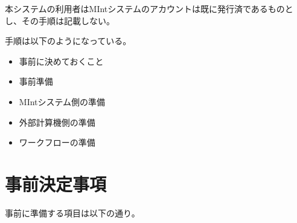 \documentclass[letterpaper,10pt,dvipdfmx,openany]{sphinxmanual}
\begin{document}
本システムの利用者はMIntシステムのアカウントは既に発行済であるものとし、その手順は記載しない。

手順は以下のようになっている。
\begin{itemize}
\item {} 
事前に決めておくこと

\item {} 
事前準備

\item {} 
MIntシステム側の準備

\item {} 
外部計算機側の準備

\item {} 
ワークフローの準備

\end{itemize}


\section{事前決定事項}
\label{\detokenize{using_distributed_properties:id25}}
事前に準備する項目は以下の通り。
\end{document}
